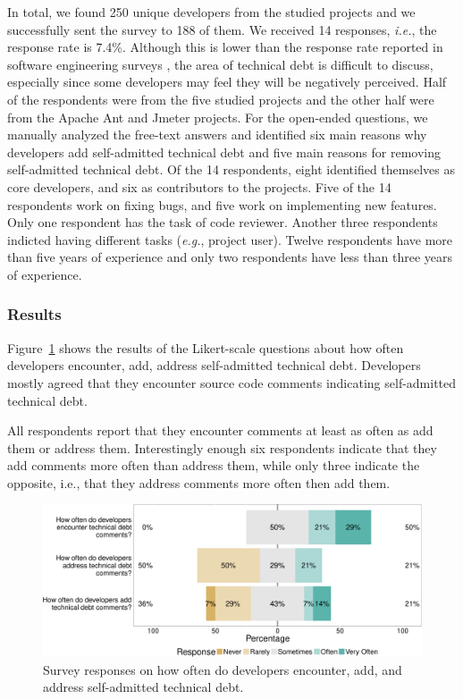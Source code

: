 In total, we found 250 unique developers from the studied projects and we successfully sent the survey to 188 of them.  We received 14 responses, \emph{i.e.}, the response rate is 7.4\%. Although this is lower than the response rate reported in software engineering surveys \cite{Punter2003}, the area of technical debt is difficult to discuss, especially since some developers may feel they will be negatively perceived. Half of the respondents were from the five studied projects and the other half were from the Apache Ant and Jmeter projects. For the open-ended questions, we manually analyzed the free-text answers and identified six main reasons why developers add self-admitted technical debt and five main reasons for removing self-admitted technical debt. Of the 14 respondents, eight identified themselves as core developers, and six as contributors to the projects. Five of the 14 respondents work on fixing bugs, and five work on implementing new features. Only one respondent has the task of code reviewer. Another three respondents indicted having different tasks (\emph{e.g.}, project user). Twelve respondents have more than five years of experience and only two respondents have less than three years of experience.




\subsubsection*{Results} 
Figure~\ref{fig:encouner_add_address} shows the results of the Likert-scale questions about how often developers encounter, add, address self-admitted technical debt. Developers mostly agreed that they encounter source code comments indicating self-admitted technical debt. 




All respondents report that they encounter \SATD comments at least as often as add them or address them. Interestingly enough six respondents indicate that they add \SATD comments more often than address them, while only three indicate the opposite, i.e., that they address \SATD comments more often then add them.


 
 \begin{figure}[t]
 	\centering
 	\includegraphics[width=0.95\columnwidth]{figures/test/_responses_question_.pdf}
 	\caption{Survey responses on how often do developers encounter, add, and address self-admitted technical debt.}
 	\label{fig:encouner_add_address}
 \end{figure}


